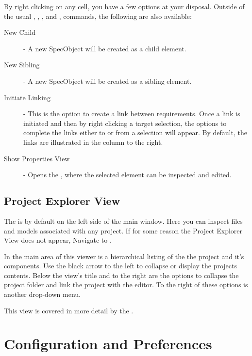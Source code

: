 By right clicking on any cell, you have a few options at your disposal. Outside of the usual , , ,  and , commands, the following are also available:

\begin{description}
\item
  [New Child] - A new SpecObject will be created as a child element.
\item
  [New Sibling] - A new SpecObject will be created as a sibling element.
\item
  [Initiate Linking] - This is the option to create a link between requirements. Once a link is initiated and then by right clicking a target selection, the options to complete the links either to or from a selection will appear. By default, the links are illustrated in the  column to the right. 
\item
  [Show Properties View] - Opens the , where the selected element can be inspected and edited.
\end{description}

\subsection{Project Explorer View}

The  is by default on the left side of the main window. Here you can inspect files and models associated with any project. If for some reason the Project Explorer View does not appear, Navigate to .

In the main area  of this viewer is a hierarchical listing of the the project and it's components. Use the black arrow to the left to collapse or display the projects contents. Below the view's title and to the right are the options to collapse the project folder and link the project with the editor. To the right of these options is another drop-down menu.

This view is covered in more detail by the .

\section{Configuration and Preferences}

